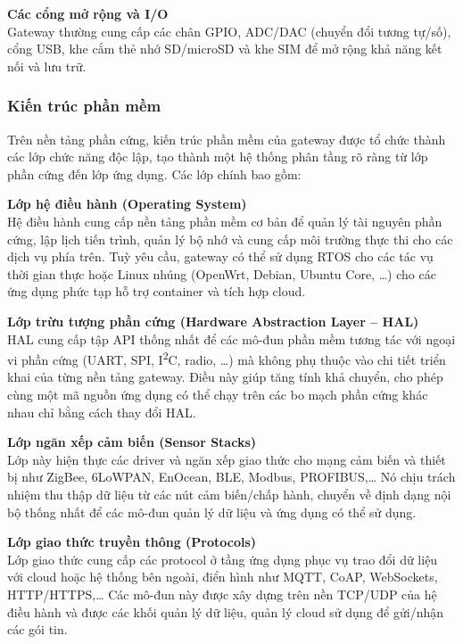                     \textbf{Các cổng mở rộng và I/O}\\
                        Gateway thường cung cấp các chân GPIO, ADC/DAC (chuyển đổi tương tự/số), cổng USB, khe cắm thẻ nhớ SD/microSD và khe SIM để mở rộng khả năng kết nối và lưu trữ.

                \subsubsection{Kiến trúc phần mềm}
                    Trên nền tảng phần cứng, kiến trúc phần mềm của gateway được tổ chức thành các lớp chức năng độc lập, tạo thành một hệ thống phân tầng rõ ràng từ lớp phần cứng đến lớp ứng dụng. Các lớp chính bao gồm:

                    \textbf{Lớp hệ điều hành (Operating System)}\\
                        Hệ điều hành cung cấp nền tảng phần mềm cơ bản để quản lý tài nguyên phần cứng, lập lịch tiến trình, quản lý bộ nhớ và cung cấp môi trường thực thi cho các dịch vụ phía trên. Tuỳ yêu cầu, gateway có thể sử dụng RTOS cho các tác vụ thời gian thực hoặc Linux nhúng (OpenWrt, Debian, Ubuntu Core, \dots) cho các ứng dụng phức tạp hỗ trợ container và tích hợp cloud.
                    
                    \textbf{Lớp trừu tượng phần cứng (Hardware Abstraction Layer -- HAL)}\\
                        HAL cung cấp tập API thống nhất để các mô-đun phần mềm tương tác với ngoại vi phần cứng (UART, SPI, I\textsuperscript{2}C, radio, \dots) mà không phụ thuộc vào chi tiết triển khai của từng nền tảng gateway. Điều này giúp tăng tính khả chuyển, cho phép cùng một mã nguồn ứng dụng có thể chạy trên các bo mạch phần cứng khác nhau chỉ bằng cách thay đổi HAL.
                    
                    \textbf{Lớp ngăn xếp cảm biến (Sensor Stacks)}\\
                        Lớp này hiện thực các driver và ngăn xếp giao thức cho mạng cảm biến và thiết bị như ZigBee, 6LoWPAN, EnOcean, BLE, Modbus, PROFIBUS,\dots{} Nó chịu trách nhiệm thu thập dữ liệu từ các nút cảm biến/chấp hành, chuyển về định dạng nội bộ thống nhất để các mô-đun quản lý dữ liệu và ứng dụng có thể sử dụng.
                    
                    \textbf{Lớp giao thức truyền thông (Protocols)}\\
                        Lớp giao thức cung cấp các protocol ở tầng ứng dụng phục vụ trao đổi dữ liệu với cloud hoặc hệ thống bên ngoài, điển hình như MQTT, CoAP, WebSockets, HTTP/HTTPS,\dots{} Các mô-đun này được xây dựng trên nền TCP/UDP của hệ điều hành và được các khối quản lý dữ liệu, quản lý cloud sử dụng để gửi/nhận các gói tin.
                    
